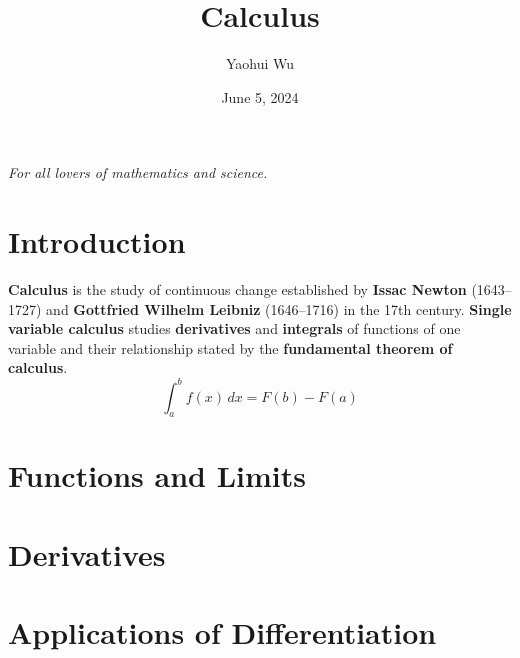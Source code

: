 \documentclass[12pt]{article}
\title{Calculus}
\author{Yaohui Wu}
\date{June 5, 2024}
\begin{document}
\maketitle

\begin{center}
    \textit{For all lovers of mathematics and science.}
\end{center}

\section*{Introduction}
\textbf{Calculus} is the study of continuous change established by
\textbf{Issac Newton} (1643--1727) and \textbf{Gottfried Wilhelm Leibniz}
(1646--1716) in the 17th century.
\textbf{Single variable calculus} studies \textbf{derivatives} and
\textbf{integrals} of functions of one variable and their relationship stated
by the \textbf{fundamental theorem of calculus}.
\[\int_a^b f(x) \,dx = F(b)-F(a)\]

\tableofcontents

\newpage
\section{Functions and Limits}






\section{Derivatives}






\section{Applications of Differentiation}




\end{document}
